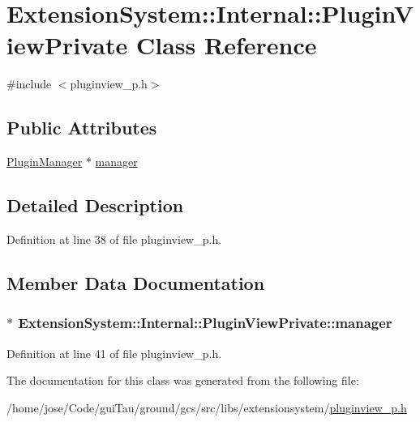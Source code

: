 \hypertarget{class_extension_system_1_1_internal_1_1_plugin_view_private}{\section{Extension\-System\-:\-:Internal\-:\-:Plugin\-View\-Private Class Reference}
\label{class_extension_system_1_1_internal_1_1_plugin_view_private}
}


{\ttfamily \#include $<$pluginview\-\_\-p.\-h$>$}

\subsection*{Public Attributes}
\begin{DoxyCompactItemize}
\item 
\hyperlink{class_extension_system_1_1_plugin_manager}{Plugin\-Manager} $\ast$ \hyperlink{class_extension_system_1_1_internal_1_1_plugin_view_private_ae2536bd8dab81cd1ae84cf4973b79f7f}{manager}
\end{DoxyCompactItemize}


\subsection{Detailed Description}


Definition at line 38 of file pluginview\-\_\-p.\-h.



\subsection{Member Data Documentation}
\hypertarget{class_extension_system_1_1_internal_1_1_plugin_view_private_ae2536bd8dab81cd1ae84cf4973b79f7f}{
\subsubsection[{manager}]{$\ast$ Extension\-System\-::\-Internal\-::\-Plugin\-View\-Private\-::manager}}\label{class_extension_system_1_1_internal_1_1_plugin_view_private_ae2536bd8dab81cd1ae84cf4973b79f7f}


Definition at line 41 of file pluginview\-\_\-p.\-h.



The documentation for this class was generated from the following file\-:\begin{DoxyCompactItemize}
\item 
/home/jose/\-Code/gui\-Tau/ground/gcs/src/libs/extensionsystem/\hyperlink{pluginview__p_8h}{pluginview\-\_\-p.\-h}\end{DoxyCompactItemize}

